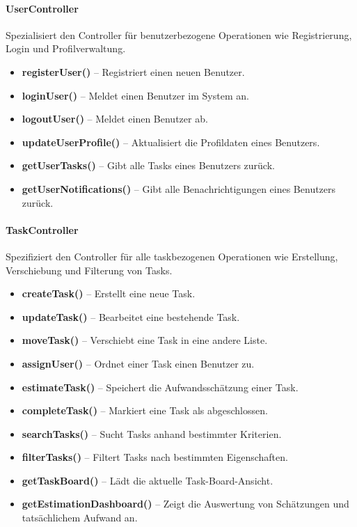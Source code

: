 \documentclass{article}
\begin{document}
\paragraph{UserController}
Spezialisiert den Controller für benutzerbezogene Operationen wie Registrierung, Login und Profilverwaltung.
\begin{itemize}
	\item \textbf{registerUser()} -- Registriert einen neuen Benutzer.
	\item \textbf{loginUser()} -- Meldet einen Benutzer im System an.
	\item \textbf{logoutUser()} -- Meldet einen Benutzer ab.
	\item \textbf{updateUserProfile()} -- Aktualisiert die Profildaten eines Benutzers.
	\item \textbf{getUserTasks()} -- Gibt alle Tasks eines Benutzers zurück.
	\item \textbf{getUserNotifications()} -- Gibt alle Benachrichtigungen eines Benutzers zurück.
\end{itemize}

\paragraph{TaskController}
Spezifiziert den Controller für alle taskbezogenen Operationen wie Erstellung, Verschiebung und Filterung von Tasks.
\begin{itemize}
	\item \textbf{createTask()} -- Erstellt eine neue Task.
	\item \textbf{updateTask()} -- Bearbeitet eine bestehende Task.
	\item \textbf{moveTask()} -- Verschiebt eine Task in eine andere Liste.
	\item \textbf{assignUser()} -- Ordnet einer Task einen Benutzer zu.
	\item \textbf{estimateTask()} -- Speichert die Aufwandsschätzung einer Task.
	\item \textbf{completeTask()} -- Markiert eine Task als abgeschlossen.
	\item \textbf{searchTasks()} -- Sucht Tasks anhand bestimmter Kriterien.
	\item \textbf{filterTasks()} -- Filtert Tasks nach bestimmten Eigenschaften.
	\item \textbf{getTaskBoard()} -- Lädt die aktuelle Task-Board-Ansicht.
	\item \textbf{getEstimationDashboard()} -- Zeigt die Auswertung von Schätzungen und tatsächlichem Aufwand an.
\end{itemize}
\end{document}
